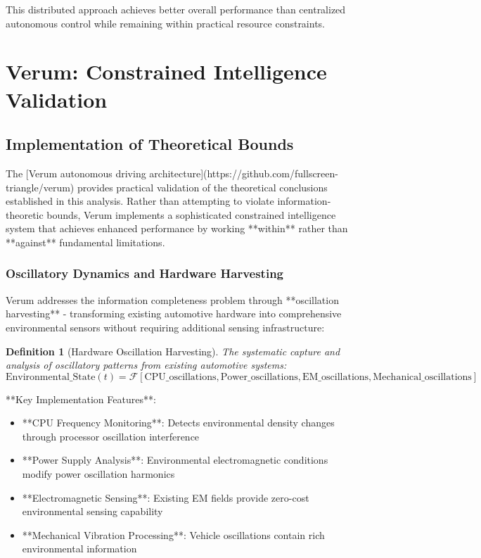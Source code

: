 \documentclass[12pt,a4paper]{article}
\newtheorem{definition}[theorem]{Definition}
\begin{document}
This distributed approach achieves better overall performance than centralized autonomous control while remaining within practical resource constraints.

\section{Verum: Constrained Intelligence Validation}

\subsection{Implementation of Theoretical Bounds}

The [Verum autonomous driving architecture](https://github.com/fullscreen-triangle/verum) provides practical validation of the theoretical conclusions established in this analysis. Rather than attempting to violate information-theoretic bounds, Verum implements a sophisticated constrained intelligence system that achieves enhanced performance by working **within** rather than **against** fundamental limitations.

\subsubsection{Oscillatory Dynamics and Hardware Harvesting}

Verum addresses the information completeness problem through **oscillation harvesting** - transforming existing automotive hardware into comprehensive environmental sensors without requiring additional sensing infrastructure:

\begin{definition}[Hardware Oscillation Harvesting]
The systematic capture and analysis of oscillatory patterns from existing automotive systems:
$$\text{Environmental\_State}(t) = \mathcal{F}[\text{CPU\_oscillations}, \text{Power\_oscillations}, \text{EM\_oscillations}, \text{Mechanical\_oscillations}]$$
\end{definition}

**Key Implementation Features**:
\begin{itemize}
\item **CPU Frequency Monitoring**: Detects environmental density changes through processor oscillation interference
\item **Power Supply Analysis**: Environmental electromagnetic conditions modify power oscillation harmonics
\item **Electromagnetic Sensing**: Existing EM fields provide zero-cost environmental sensing capability
\item **Mechanical Vibration Processing**: Vehicle oscillations contain rich environmental information
\end{itemize}
\end{document}
